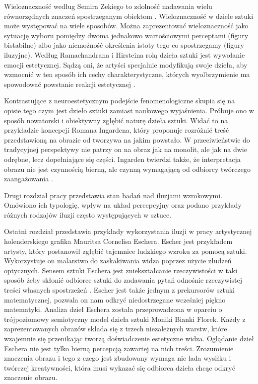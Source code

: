 \documentclass[licencjacka]{kdypl}
\begin{document}
Wieloznaczność według Semira Zekiego to zdolność nadawania wielu równorzędnych znaczeń spostrzeganym obiektom \citep{Wieloznacznosc}. Wieloznaczność w dziele sztuki może występować na wiele sposobów. Można zaprezentować wieloznaczność jako sytuację wyboru pomiędzy dwoma jednakowo wartościowymi perceptami (figury bistabilne) albo jako niemożność określenia istoty tego co spostrzegamy (figury iluzyjne). Według Ramachandrana i Hirsteina rolą dzieła sztuki jest wywołanie emocji estetycznej. Sądzą oni, że artyści specjalnie modyfikują swoje dzieła, aby wzmocnić w ten sposób ich cechy charakterystyczne, których wyolbrzymienie ma spowodować powstanie reakcji estetycznej \citep{Rama}.

Kontrastujące z neuroestetycznym podejście fenomenologiczne skupia się na opisie tego czym jest dzieło sztuki zamiast naukowego wyjaśnienia. Próbuje ono w sposób nowatorski i obiektywny zgłębić naturę dzieła sztuki. Widać to na przykładzie koncepcji Romana Ingardena, który proponuje rozróżnić treść przedstawioną na obrazie od tworzywa na jakim powstało. W przeciwieństwie do tradycyjnej perspektywy nie patrzy on na obraz jak na monolit, ale jak na dwie odrębne, lecz dopełniające się części. Ingarden twierdzi także, że interpretacja obrazu nie jest czynnością bierną, ale czynną wymagającą od odbiorcy twórczego zaangażowania \citep{Ingarden1958}.

Drugi rozdział pracy przedstawia stan badań nad iluzjami wzrokowymi. Omówiono ich typologię, wpływ na układ percepcyjny oraz podano przykłady różnych rodzajów iluzji często występujących w sztuce.

Ostatni rozdział przedstawia przykłady wykorzystania iluzji w pracy artystycznej holenderskiego grafika Mauritsa Cornelisa Eschera. Escher jest przykładem artysty, który postanowił zgłębić tajemnice ludzkiego wzroku za pomocą sztuki. Wykorzystuje on malarstwo do zaskakiwania widza poprzez użycie złudzeń optycznych. Sensem sztuki Eschera jest zniekształcanie rzeczywistości w taki sposób żeby skłonić odbiorce sztuki do zadawania pytań odnośnie rzeczywistej treści własnych spostrzeżeń \citep{Locher}. Escher jest także jednym z prekursorów sztuki matematycznej, pozwala on nam odkryć niedostrzegane wcześniej piękno matematyki. Analiza dzieł Eschera została przeprowadzona w oparciu o trójpoziomowy semiotyczny model dzieła sztuki Moniki Bianki Florek. Każdy z zaprezentowanych obrazów składa się z trzech niezależnych warstw, które wzajemnie się przenikając tworzą doświadczenie estetyczne widza. Oglądanie dzieł Eschera nie jest tylko bierną percepcją zawartej na nich treści. Zrozumienie znaczenia obrazu i tego z czego jest zbudowany wymaga nie lada wysiłku i twórczej kreatywności, która musi wykazać się odbiorca dzieła chcąc odkryć znaczenie obrazu.
\end{document}
